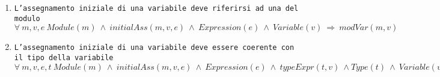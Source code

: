 
\begin{enumerate}
	\item \texttt{L'assegnamento iniziale di una variabile deve riferirsi ad una del modulo} \\
		  $\forall \ m,v,e \ Module(m) \ \land \ initialAss(m, v, e) \ \land \ Expression(e) \ \land \ Variable(v) \ \Rightarrow \ modVar(m, v)$ \\
	\item \texttt{L'assegnamento iniziale di una variabile deve essere coerente con il tipo della variabile} \\
		  $\forall \ m,v,e,t \ Module(m) \ \land \ initialAss(m, v, e) \ \land \ Expression(e) \ \land \ typeExpr(t, v) \ \land Type(t) \ \land \ Variable(v) \ \Rightarrow \ typeExpr(t, e)$ \\
\end{enumerate}